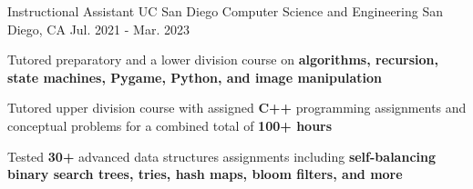 \begin{cventries}
  \cventry
    {Instructional Assistant}
    {UC San Diego Computer Science and Engineering} %
    {San Diego, CA} %
    {Jul. 2021 - Mar. 2023}
    {
      \begin{cvitems}
        \item {Tutored preparatory and a lower division course on \textbf{algorithms, recursion, state machines, Pygame, Python, and image manipulation}}
        \item {Tutored upper division course with assigned \textbf{C++} programming assignments and conceptual problems for a combined total of \textbf{100+ hours}}
        \item {Tested \textbf{30+} advanced data structures assignments including \textbf{self-balancing binary search trees, tries, hash maps, bloom filters, and more}}
      \end{cvitems}
    }



\end{cventries}
